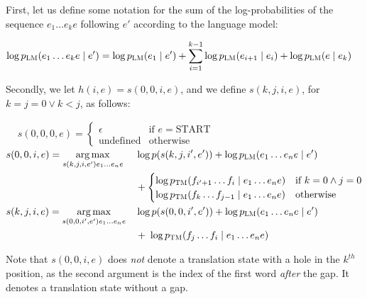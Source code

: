 \documentclass[answers]{exam}
\newcommand{\ptm}[1]{p_{\textsc{TM}}(#1)}
\newcommand{\plm}[1]{p_{\textsc{LM}}(#1)}
\DeclareMathOperator*{\argmax}{arg\,max}
\begin{document}
\begin{questions}
\begin{framed}
  \begingroup\raggedright
  First, let us define some notation for the sum of the log-probabilities of the
  sequence $e_{1}\dots e_{k}e$ following $e'$ according to the language model: 
  \par\endgroup
  \(\!
  \begin{aligned}
    \log{\plm{e_{1}\dots e_{k}e \mid e'}}
    = \log{\plm{e_{1} \mid e'}}
    + \sum_{i=1}^{k-1}{\log{\plm{e_{i+1} \mid e_{i}}}}
    + \log{\plm{e \mid e_{k}}}
  \end{aligned}
  \)
  \\
  \begingroup\raggedright
  Secondly, we let $h(i,e) = s(0,0,i,e)$, and we define $s(k,j,i,e)$, for $k =
  j = 0 \lor k < j$, as follows:
  \par\endgroup
  \(\!
  \begin{aligned}
    &s(0,0,0,e) =
    \begin{cases}
      \epsilon         &\text{if }e = \text{START}\\
      \text{undefined} &\text{otherwise}
    \end{cases}
  \end{aligned}
  \)
  \(\!
  \begin{aligned}
    &s(0,0,i,e) = \argmax_{s(k,j,i,e')e_{1}\dots e_{n}e}
    &&\log{p(s(k,j,i',e'))} + \log{\plm{e_{1}\dots e_{n}e \mid e'}}
    \\& &&+
    \begin{cases}
      \log{\ptm{f_{i'+1}\dots f_{i} \mid e_{1}\dots e_{n}e}}
      &\text{if }k = 0 \land j = 0
      \\
      \log{\ptm{f_{k}\dots f_{j-1} \mid e_{1}\dots e_{n}e}}
      &\text{otherwise}
    \end{cases}
    \\
    &s(k,j,i,e) =
    \argmax_{s(0,0,i',e')e_{1}\dots e_{n}e}
    &&\log{p(s(0,0,i',e'))} + \log{\plm{e_{1}\dots e_{n}e \mid e'}} 
    \\& &&+\;\log{\ptm{f_{j}\dots f_{i} \mid e_{1}\dots e_{n}e}}
  \end{aligned}
  \)
  \\
  \begingroup\raggedright
  Note that $s(0,0,i,e)$ does \emph{not} denote a translation state with a hole
  in the $k^{th}$ position, as the second argument is the index of the first
  word \emph{after} the gap. It denotes a translation state without a gap.
  \par\endgroup
\end{framed}



\end{questions}
\end{document}
